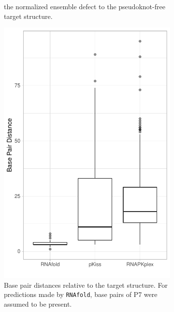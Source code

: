 \documentclass[../../master.tex]{subfiles}
\begin{document}
\begin{figure}[!ht]
\begin{subfigure}[t]{0.2\textwidth}
		\caption{the normalized ensemble defect to the pseudoknot-free target structure.
		}\label{fig:stats_proto:b}
	\end{subfigure}%
	\begin{subfigure}[t]{0.27\textwidth}
		\centering
		\includegraphics[width=\textwidth]{pic/results/designs/boxplots/proto-bp-boxplot.pdf}
		\caption{Base pair distances relative to the target structure. For predictions made by \texttt{RNAfold}, base pairs of P7 were assumed to be present.
		}\label{fig:stats_proto:c}
	\end{subfigure}
	\begin{subfigure}[t]{0.27\textwidth}
		\centering

\end{subfigure}
\end{figure}
\end{document}
